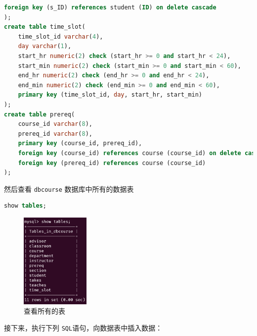 \documentclass{article}
\begin{document}
\begin{lstlisting}[language=sql]
    foreign key (s_ID) references student (ID) on delete cascade
);
create table time_slot(
    time_slot_id varchar(4),
    day varchar(1),
    start_hr numeric(2) check (start_hr >= 0 and start_hr < 24),
    start_min numeric(2) check (start_min >= 0 and start_min < 60),
    end_hr numeric(2) check (end_hr >= 0 and end_hr < 24),
    end_min numeric(2) check (end_min >= 0 and end_min < 60),
    primary key (time_slot_id, day, start_hr, start_min)
);
create table prereq(
    course_id varchar(8),
    prereq_id varchar(8),
    primary key (course_id, prereq_id),
    foreign key (course_id) references course (course_id) on delete cascade,
    foreign key (prereq_id) references course (course_id)
);
\end{lstlisting}

然后查看 \texttt{dbcourse} 数据库中所有的数据表

\begin{lstlisting}[language=sql]
show tables;
\end{lstlisting}

\begin{figure}[H]
  \centering
  \includegraphics[width=0.3\textwidth]{img/11.png}
  \caption{查看所有的表}
\end{figure}

接下来，执行下列 \texttt{SQL}语句，向数据表中插入数据：
\end{document}
